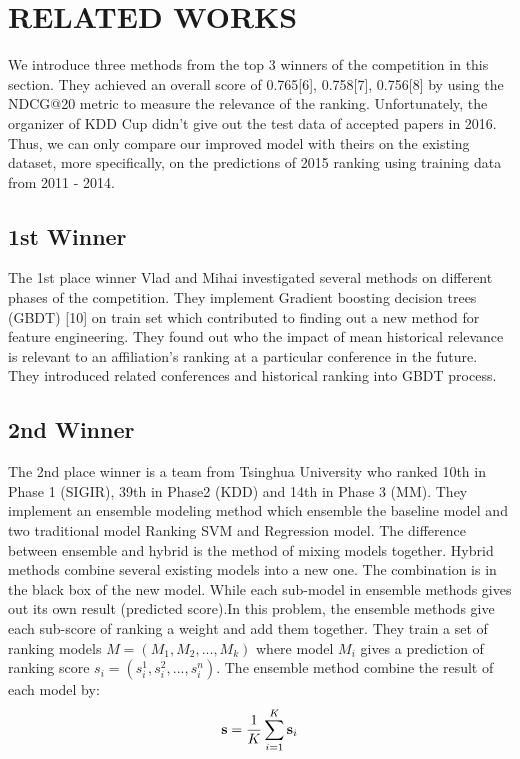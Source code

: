 \documentclass[letterpaper]{article}
\begin{document}
\section{RELATED WORKS}
We introduce three methods from the top 3 winners of the competition in this section. They achieved an overall score of 0.765[6], 0.758[7], 0.756[8] by using the NDCG@20 metric to measure the relevance of the ranking. Unfortunately, the organizer of KDD Cup didn't give out the test data of accepted papers in 2016. Thus, we can only compare our improved model with theirs on the existing dataset, more specifically, on the predictions of 2015 ranking using training data from 2011 - 2014.

\subsection{1st Winner}
The 1st place winner Vlad and Mihai investigated several methods on different phases of the competition. They implement Gradient boosting decision trees (GBDT) [10] on train set which contributed to finding out a new method for feature engineering. They found out who the impact of mean historical relevance is relevant to an affiliation's ranking at a particular conference in the future. They introduced related conferences and historical ranking into GBDT process.

\subsection{2nd Winner}
The 2nd place winner is a team from Tsinghua University who ranked 10th in Phase 1 (SIGIR), 39th in Phase2 (KDD) and 14th in Phase 3 (MM). They implement an ensemble modeling method which ensemble the baseline model and two traditional model Ranking SVM and Regression model. The difference between ensemble and hybrid is the method of mixing models together. Hybrid methods combine several existing models into a new one. The combination is in the black box of the new model. While each sub-model in ensemble methods gives out its own result (predicted score).In this problem, the ensemble methods give each sub-score of ranking a weight and add them together. They train a set of ranking models $M = (M_{1} ,M_{2} ,...,M_{k} )$ where model $M_i$ gives a prediction of ranking score $s_{i} = \left ( s_{i}^{1},s_{i}^{2},...,s_{i}^{n} \right )$. The ensemble method combine the result of each model by:\\
\begin{equation}
\textbf s = \frac{1}{K} \sum_{i=1}^{K} \textbf s_{i}
\end{equation}
    
\end{document}
